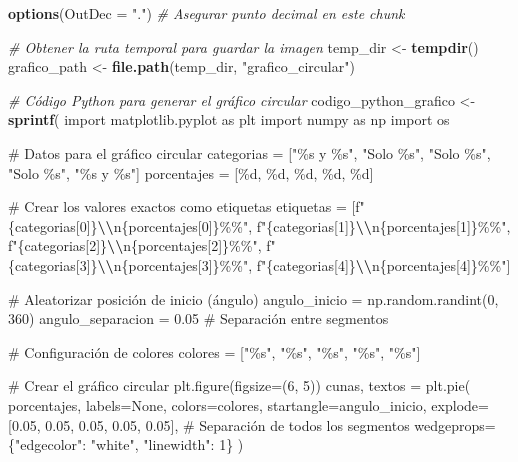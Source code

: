 \documentclass[
]{article}
\newenvironment{Shaded}{\begin{snugshade}}{\end{snugshade}}
\newcommand{\AttributeTok}[1]{\textcolor[rgb]{0.13,0.29,0.53}{#1}}
\newcommand{\CommentTok}[1]{\textcolor[rgb]{0.56,0.35,0.01}{\textit{#1}}}
\newcommand{\FunctionTok}[1]{\textcolor[rgb]{0.13,0.29,0.53}{\textbf{#1}}}
\newcommand{\NormalTok}[1]{#1}
\newcommand{\OtherTok}[1]{\textcolor[rgb]{0.56,0.35,0.01}{#1}}
\newcommand{\SpecialCharTok}[1]{\textcolor[rgb]{0.81,0.36,0.00}{\textbf{#1}}}
\newcommand{\StringTok}[1]{\textcolor[rgb]{0.31,0.60,0.02}{#1}}
\begin{document}
\begin{Shaded}
\begin{Highlighting}[]
\FunctionTok{options}\NormalTok{(}\AttributeTok{OutDec =} \StringTok{"."}\NormalTok{)  }\CommentTok{\# Asegurar punto decimal en este chunk}

\CommentTok{\# Obtener la ruta temporal para guardar la imagen}
\NormalTok{temp\_dir }\OtherTok{\textless{}{-}} \FunctionTok{tempdir}\NormalTok{()}
\NormalTok{grafico\_path }\OtherTok{\textless{}{-}} \FunctionTok{file.path}\NormalTok{(temp\_dir, }\StringTok{"grafico\_circular"}\NormalTok{)}

\CommentTok{\# Código Python para generar el gráfico circular}
\NormalTok{codigo\_python\_grafico }\OtherTok{\textless{}{-}} \FunctionTok{sprintf}\NormalTok{(}
\StringTok{\textquotesingle{}}
\StringTok{import matplotlib.pyplot as plt}
\StringTok{import numpy as np}
\StringTok{import os}

\StringTok{\# Datos para el gráfico circular}
\StringTok{categorias = ["\%s y \%s", "Solo \%s", "Solo \%s", "Solo \%s", "\%s y \%s"]}
\StringTok{porcentajes = [\%d, \%d, \%d, \%d, \%d]}

\StringTok{\# Crear los valores exactos como etiquetas}
\StringTok{etiquetas = [f"\{categorias[0]\}}\SpecialCharTok{\textbackslash{}\textbackslash{}}\StringTok{n\{porcentajes[0]\}\%\%",}
\StringTok{            f"\{categorias[1]\}}\SpecialCharTok{\textbackslash{}\textbackslash{}}\StringTok{n\{porcentajes[1]\}\%\%",}
\StringTok{            f"\{categorias[2]\}}\SpecialCharTok{\textbackslash{}\textbackslash{}}\StringTok{n\{porcentajes[2]\}\%\%",}
\StringTok{            f"\{categorias[3]\}}\SpecialCharTok{\textbackslash{}\textbackslash{}}\StringTok{n\{porcentajes[3]\}\%\%",}
\StringTok{            f"\{categorias[4]\}}\SpecialCharTok{\textbackslash{}\textbackslash{}}\StringTok{n\{porcentajes[4]\}\%\%"]}

\StringTok{\# Aleatorizar posición de inicio (ángulo)}
\StringTok{angulo\_inicio = np.random.randint(0, 360)}
\StringTok{angulo\_separacion = 0.05  \# Separación entre segmentos}

\StringTok{\# Configuración de colores}
\StringTok{colores = ["\%s", "\%s", "\%s", "\%s", "\%s"]}

\StringTok{\# Crear el gráfico circular}
\StringTok{plt.figure(figsize=(6, 5))}
\StringTok{cunas, textos = plt.pie(}
\StringTok{    porcentajes,}
\StringTok{    labels=None,}
\StringTok{    colors=colores,}
\StringTok{    startangle=angulo\_inicio,}
\StringTok{    explode=[0.05, 0.05, 0.05, 0.05, 0.05],  \# Separación de todos los segmentos}
\StringTok{    wedgeprops=\{"edgecolor": "white", "linewidth": 1\}}
\StringTok{)}


\end{Highlighting}
\end{Shaded}
\end{document}
